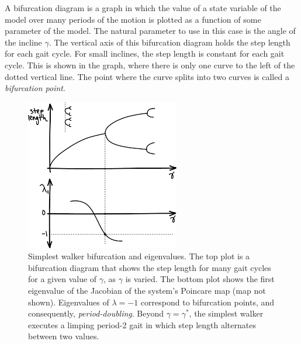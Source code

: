 A bifurcation diagram is a graph in which the value of a state variable of the
model over many periods of the motion is plotted as a function of some
parameter of the model. The natural parameter to use in this case is the angle
of the incline $\gamma$. The vertical axis of this bifurcation diagram holds
the step length for each gait cycle. For small inclines, the step length is
constant for each gait cycle. This is shown in the graph, where there is only
one curve to the left of the dotted vertical line. The point where the curve
splits into two curves is called a \emph{bifurcation point}.


\begin{figure}[h]		%
\begin{centering}
\includegraphics[width=0.6\textwidth]{Figures/SimplestWalkerEigenvalues}\par
\end{centering}
\caption[Plot: Simplest Walker Bifurcation and Eigenvalues]{Simplest walker
bifurcation and eigenvalues. The top plot is a bifurcation diagram that shows
the step length for many gait cycles for a given value of $\gamma$, as $\gamma$
is varied. The bottom plot shows the first eigenvalue of the Jacobian of the
system's Poincare map (map not shown). Eigenvalues of $\lambda = -1$ correspond
to bifurcation points, and consequently, \emph{period-doubling}. Beyond
$\gamma = \gamma^{*}$, the simplest walker executes a limping period-2 gait in
which step length alternates between two values.}
\label{fig:SimplestWalkerEigenvalues}
\end{figure}
%


